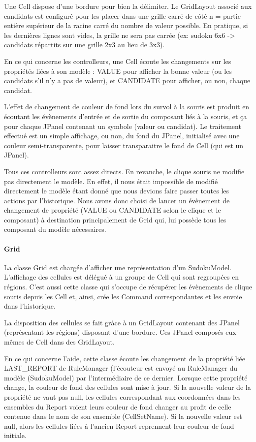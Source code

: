 Une Cell dispose d'une bordure pour bien la délimiter.
Le GridLayout associé aux candidats est configuré pour les placer dans une grille
carré de côté n = partie entière supérieur de la racine carré du nombre de valeur
possible. En pratique, si les dernières lignes sont vides, la grille ne sera pas
carrée (ex: sudoku 6x6 -> candidats répartits sur une grille 2x3 au lieu de 3x3).

En ce qui concerne les controlleurs, une Cell écoute les changements sur les
propriétés liées à son modèle : VALUE pour afficher la bonne valeur (ou les
candidats s'il n'y a pas de valeur), et CANDIDATE pour afficher, ou non, chaque
candidat.

L'effet de changement de couleur de fond lors du survol à la souris est produit
en écoutant les évènements d'entrée et de sortie du composant liés à la souris,
et ça pour chaque JPanel contenant un symbole (valeur ou candidat). Le traitement
effectué est un simple affichage, ou non, du fond du JPanel, initialisé avec une
couleur semi-transparente, pour laisser transparaitre le fond de Cell (qui est
un JPanel).

Tous ces controlleurs sont assez directs. En revanche, le clique souris ne
modifie pas directement le modèle. En effet, il nous était impossible de modifié
directement le modèle étant donné que nous devions faire passer toutes les actions
par l'historique. Nous avons donc choisi de lancer un évènement de changement de
propriété (VALUE ou CANDIDATE selon le clique et le composant) à destination
principalement de Grid qui, lui possède tous les composant du modèle nécessaires.

\paragraph{Grid}
    
La classe Grid est chargée d'afficher une représentation d'un SudokuModel.
L'affichage des cellules est délégué à un groupe de Cell qui sont regroupées en
régions. C'est aussi cette classe qui s'occupe de récupérer les évènements de
clique souris depuis les Cell et, ainsi, crée les Command correspondantes et les
envoie dans l'historique.

La disposition des cellules se fait gràce à un GridLayout contenant des JPanel
(représentant les régions) disposant d'une bordure. Ces JPanel composés eux-mêmes
de Cell dans des GridLayout.

En ce qui concerne l'aide, cette classe écoute les changement de la propriété liée
LAST\_REPORT de RuleManager (l'écouteur est envoyé au RuleManager du modèle (SudokuModel)
par l'intermédiaire de ce dernier. Lorsque cette propriété change, la couleur de fond
des cellules sont mise à jour. Si la nouvelle valeur de la propriété ne vaut pas null,
les cellules correspondant aux coordonnées dans les ensembles du Report voient leurs
couleur de fond changer au profit de celle contenue dans le nom de son ensemble
(CellSetName). Si la nouvelle valeur est null, alors les cellules liées à l'ancien
Report reprennent leur couleur de fond initiale.

